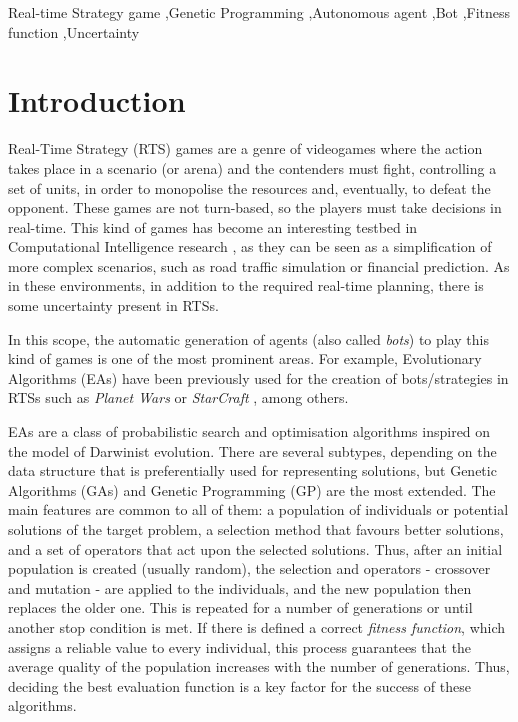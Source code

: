\documentclass[preprint]{elsarticle}
\begin{document}
\begin{frontmatter}
%
%
\begin{keyword}
Real-time Strategy game \sep Genetic Programming \sep Autonomous agent \sep Bot \sep Fitness function \sep Uncertainty
\end{keyword}

\end{frontmatter}


\section{Introduction}
\noindent 

Real-Time Strategy (RTS) games are a genre of videogames where the action takes place in a scenario (or arena) and the contenders must fight, controlling a set of units, in order to monopolise the resources and, eventually, to defeat the opponent. These games are not turn-based, so the players must take decisions in real-time. This kind of games has become an interesting testbed in Computational Intelligence research \cite{Lara2013review}, as they can be seen as a simplification of more complex scenarios, such as road traffic simulation or financial prediction. As in these environments, in addition to the required real-time planning, there is some uncertainty present in RTSs.

In this scope, the automatic generation of agents (also called {\em bots}) to play this kind of games is one of the most prominent areas. For example, Evolutionary Algorithms (EAs) have been previously used for the creation of bots/strategies in RTSs such as {\em Planet Wars} \cite{Genebot_CEC11,ExpGenebot_CIG2012,Garcia14Treedepth} or {\em StarCraft} \cite{bistrom_GP_StarCraft,Barriga2014:BuildingOrder_GA,Garcia15Starcraft}, among others. 

EAs \cite{EAs_Back96} are a class of probabilistic search and optimisation algorithms inspired on the model of Darwinist evolution. 
There are several subtypes, depending on the data structure that is preferentially used for representing solutions, but Genetic Algorithms (GAs) \cite{GAs_Goldberg89} and Genetic Programming (GP) \cite{GP_Koza92} are the most extended. The main features are common to all of them: a population of individuals or potential solutions of the target problem, a selection method that favours better solutions, and a set of operators that act upon the
selected solutions. Thus, after an initial population is created (usually random), the selection and operators - crossover and mutation - are applied to the individuals, and the new population then replaces the older one. This is repeated for a number of generations or until another stop condition is met. 
If there is defined a correct {\em fitness function}, which assigns a reliable value to every individual, this process guarantees that the average quality of the population increases with the number of generations.
Thus, deciding the best evaluation function is a key factor for the success of these algorithms.
\end{document}
